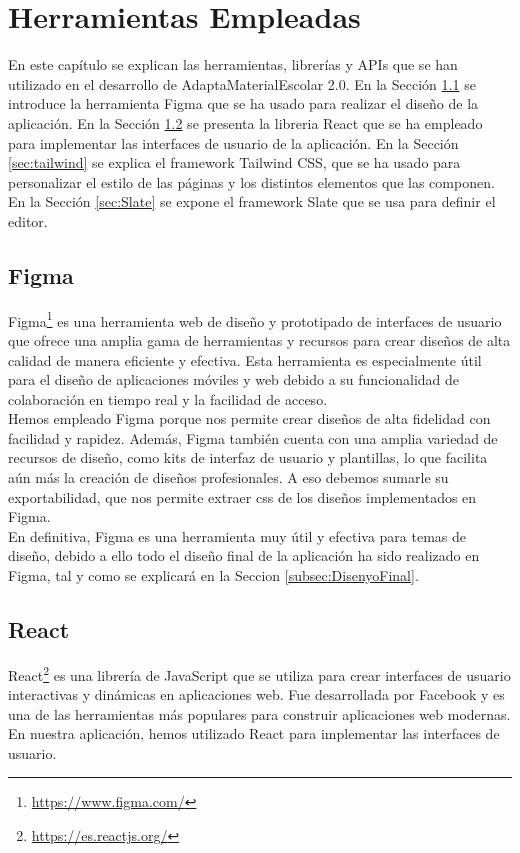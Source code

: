 \chapter{Herramientas Empleadas}\label{cap:herramientas}

En este capítulo se explican las herramientas, librerías y APIs que se han utilizado en el desarrollo de AdaptaMaterialEscolar 2.0. En la Sección \ref{sec:Figma} se introduce la herramienta Figma que se ha usado para realizar el diseño de la aplicación. En la Sección \ref{sec:React} se presenta la libreria React que se ha empleado para implementar las interfaces de usuario de la aplicación. En la Sección \ref{sec:tailwind} se explica el framework Tailwind CSS, que se ha usado para personalizar el estilo de las páginas y los distintos elementos que las componen. En la Sección \ref{sec:Slate} se expone el framework Slate que se usa para definir el editor.

\section{Figma}\label{sec:Figma}
Figma\footnote{\url{https://www.figma.com/}} es una herramienta web de diseño y prototipado de interfaces de usuario que ofrece una amplia gama de herramientas y recursos para crear diseños de alta calidad de manera eficiente y efectiva. Esta herramienta es especialmente útil para el diseño de aplicaciones móviles y web debido a su funcionalidad de colaboración en tiempo real y la facilidad de acceso.
\\

Hemos empleado Figma porque nos permite crear diseños de alta fidelidad con facilidad y rapidez. Además, Figma también cuenta con una amplia variedad de recursos de diseño, como kits de interfaz de usuario y plantillas, lo que facilita aún más la creación de diseños profesionales. A eso debemos sumarle su exportabilidad, que nos permite extraer css de los diseños implementados en Figma.
\\

En definitiva, Figma es una herramienta muy útil y efectiva para temas de diseño, debido a ello todo el diseño final de la aplicación ha sido realizado en Figma, tal y como se explicará en la Seccion \ref{subsec:DisenyoFinal}.

\section{React}\label{sec:React}
React\footnote{\url{https://es.reactjs.org/}} es una librería de JavaScript que se utiliza para crear interfaces de usuario interactivas y dinámicas en aplicaciones web. Fue desarrollada por Facebook y es una de las herramientas más populares para construir aplicaciones web modernas. En nuestra aplicación, hemos utilizado React para implementar las interfaces de usuario.

